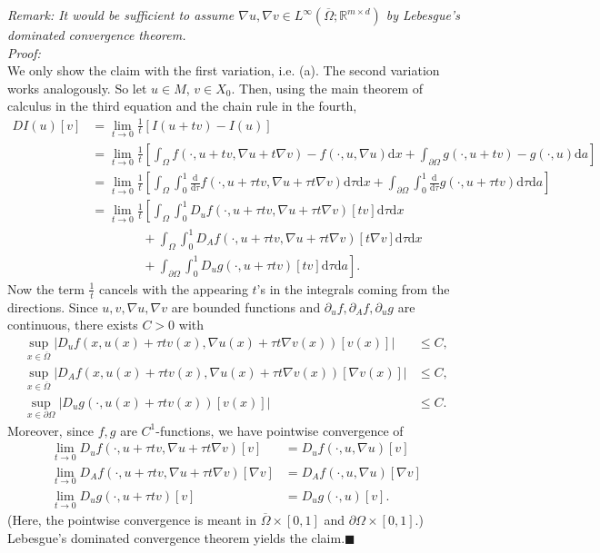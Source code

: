 \textit{Remark: It would be sufficient to assume $\nabla u,\nabla v\in L^\infty(\overline{\Omega};\mathbb{R}^{m\times d})$ by Lebesgue's dominated convergence theorem.}\\

\textit{Proof:}\\
We only show the claim with the first variation, i.e. (a). The second variation works analogously. So let $u\in M$, $v\in X_0$. Then, using the main theorem of calculus in the third equation and the chain rule in the fourth,
\begin{align*}
	DI(u)[v]&=\lim_{t\to0}{\frac{1}{t}[I(u+tv)-I(u)]}\\
	&=\lim_{t\to0}{\frac{1}{t}\left[\int_\Omega{f(\cdot,u+tv,\nabla u+t\nabla v)-f(\cdot,u,\nabla u)\mathrm{d}x}+\int_{\partial\Omega}{g(\cdot,u+tv)-g(\cdot,u)\mathrm{d}a}\right]}\\
	&=\lim_{t\to0}{\frac{1}{t}\left[\int_\Omega{\int_0^1{\frac{\mathrm{d}}{\mathrm{d}\tau}f(\cdot,u+\tau tv,\nabla u+\tau t\nabla v)\mathrm{d}\tau}\mathrm{d}x}+\int_{\partial\Omega}{\int_0^1{\frac{\mathrm{d}}{\mathrm{d}\tau}g(\cdot,u+\tau tv)\mathrm{d}\tau}\mathrm{d}a}\right]}\\
	&=\lim_{t\to0}{\frac{1}{t}\left[\int_\Omega{\int_0^1{D_uf(\cdot,u+\tau tv,\nabla u+\tau t\nabla v)[tv]\mathrm{d}\tau}\mathrm{d}x}\right.}\\
	&\qquad\qquad+\int_\Omega{\int_0^1{D_Af(\cdot,u+\tau tv,\nabla u+\tau t\nabla v)[t\nabla v]\mathrm{d}\tau}\mathrm{d}x}\\
	&\qquad\qquad+\left.\int_{\partial\Omega}{\int_0^1{D_ug(\cdot,u+\tau tv)[tv]\mathrm{d}\tau}\mathrm{d}a}\right].
\end{align*}
Now the term $\frac{1}{t}$ cancels with the appearing $t$'s in the integrals coming from the directions. Since $u,v,\nabla u,\nabla v$ are bounded functions and $\partial_uf,\partial_Af,\partial_ug$ are continuous, there exists $C>0$ with
\begin{align*}
	\sup_{x\in\overline{\Omega}}{\lvert D_uf(x,u(x)+\tau tv(x),\nabla u(x)+\tau t\nabla v(x))[v(x)]\rvert}&\leq C,\\
	\sup_{x\in\overline{\Omega}}{\lvert D_Af(x,u(x)+\tau tv(x),\nabla u(x)+\tau t\nabla v(x))[\nabla v(x)]\rvert}&\leq C,\\
	\sup_{x\in\partial\Omega}{\lvert D_ug(\cdot,u(x)+\tau tv(x))[v(x)]\rvert}&\leq C.
\end{align*}
Moreover, since $f,g$ are $C^1$-functions, we have pointwise convergence of
\begin{align*}
	\lim_{t\to0}{D_uf(\cdot,u+\tau tv,\nabla u+\tau t\nabla v)[v]}&=D_uf(\cdot,u,\nabla u)[v]\\
	\lim_{t\to0}{D_Af(\cdot,u+\tau tv,\nabla u+\tau t\nabla v)[\nabla v]}&=D_Af(\cdot,u,\nabla u)[\nabla v]\\
	\lim_{t\to0}{D_ug(\cdot,u+\tau tv)[v]}&=D_ug(\cdot,u)[v].
\end{align*}
(Here, the pointwise convergence is meant in $\overline{\Omega}\times[0,1]$ and $\partial\Omega\times[0,1]$.) Lebesgue's dominated convergence theorem yields the claim.\hfill$\blacksquare$\\[11pt]

